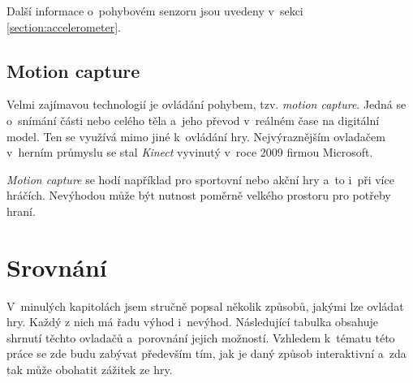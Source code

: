 \documentclass[thesis=B,czech,hidelinks]{FITthesis}[2012/06/26] %
\begin{document}
Další informace o~pohybovém senzoru jsou uvedeny v~sekci \ref{section:accelerometer}.

\subsection{Motion capture}
\label{section:motion_capture}

Velmi zajímavou technologií je ovládání pohybem, tzv. \textit{motion capture}. Jedná se o~snímání části nebo celého těla a~jeho převod v~reálném čase na digitální model. Ten se využívá mimo jiné k~ovládání hry. Nejvýraznějším ovladačem v~herním průmyslu se stal \textit{Kinect} vyvinutý v~roce 2009 firmou Microsoft. \cite{meetthekinect}

\textit{Motion capture} se hodí například pro sportovní nebo akční hry a~to i~při více hráčích. Nevýhodou může být nutnost poměrně velkého prostoru pro potřeby hraní.

\section{Srovnání}

V~minulých kapitolách jsem stručně popsal několik způsobů, jakými lze ovládat hry. Každý z nich má řadu výhod i~nevýhod. Následující tabulka obsahuje shrnutí těchto ovladačů a~porovnání jejich možností. Vzhledem k~tématu této práce se zde budu zabývat především tím, jak je daný způsob interaktivní a~zda tak může obohatit zážitek ze hry.
\end{document}
